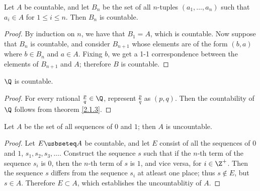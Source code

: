 \begin{theorem}\label{2.1.3}
    Let $A$ be countable, and let  $B_n$ be the set of all  $n$-tuples  $(a_1, \dots, a_n)$ 
    such that $a_i \in A$ for  $1 \leq i \leq n$. Then  $B_n$ is countable.
\end{theorem}
\begin{proof}
    By induction on $n$, we have that  $B_1=A$, which is countable. Now suppose that 
    $B_n$ is countable, and consider  $B_{n+1}$ whose elements are of the form  $(b,a)$ 
    where  $b \in B_n$ and  $a \in A$. Fixing  $b$, we get a 1-1 correspondence between the 
    elements of  $B_{n+1}$ and  $A$; therefore  $B$ is countable.
\end{proof}

\begin{corollary}
    $\Q$ is countable.
\end{corollary}
\begin{proof}
    For every rational $\frac{p}{q} \in \Q$, represent $\frac{p}{q}$ as $(p,q)$. Then 
    the countability of $\Q$ follows from theorem \ref{2.1.3}.
\end{proof}

\begin{theorem}\label{2.1.4}
    Let $A$ be the set of all sequences of $0$ and  $1$; then  $A$ is uncountable.
\end{theorem}
\begin{proof}
    Let $E \usbseteq A$ be countable, and let $E$ consist of all the sequences  of $0$ and 
    $1$,  $s_1,s_2,s_3, \dots$. Construct the sequence $s$ such that if the  $n$-th term of 
    the sequence  $s_i$ is  $0$, then the  $n$-th term of  $s$ is  $1$, and vice versa, 
    for $i \in \Z^+$. Then the sequence  $s$ differs from the sequence  $s_i$ at atleast 
    one place; thus  $s \notin E$, but  $s \in A$. Therefore  $E \subset A$, which establishes 
    the uncountablitiy of $A$.
\end{proof}

